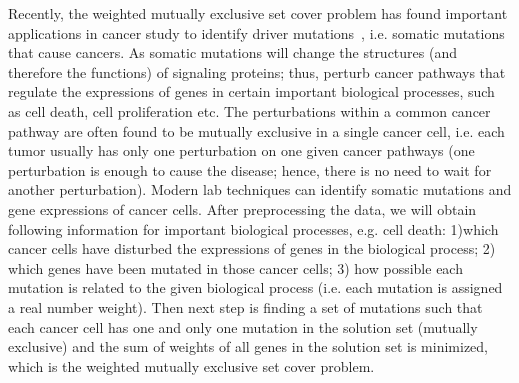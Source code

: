 \documentclass[11pt]{article}
\begin{document}
Recently, the {\sc weighted mutually exclusive set cover} problem
has found important applications in cancer study to identify
driver mutations~\cite{Ciriello,Miller}, i.e. somatic mutations
that cause cancers. As somatic mutations will change the
structures (and therefore the functions) of signaling proteins;
thus, perturb cancer pathways that regulate the expressions of
genes in certain important biological processes, such as cell
death, cell proliferation etc. The perturbations within a common
cancer pathway are often found to be mutually exclusive in a
single cancer cell, i.e. each tumor usually has only one
perturbation on one given cancer pathways (one perturbation is
enough to cause the disease; hence, there is no need to wait for
another perturbation). Modern lab techniques can identify somatic
mutations and gene expressions of cancer cells. After
preprocessing the data, we will obtain following information for
important biological processes, e.g. cell death: 1)which cancer
cells have disturbed the expressions of genes in the biological
process; 2) which genes have been mutated in those cancer cells;
3) how possible each mutation is related to the given biological
process (i.e. each mutation is assigned a real number weight).
Then next step is finding a set of mutations such that each cancer
cell has one and only one mutation in the solution set (mutually
exclusive) and the sum of weights of all genes in the solution set
is minimized, which is the {\sc weighted mutually exclusive set
cover} problem.
\end{document}
